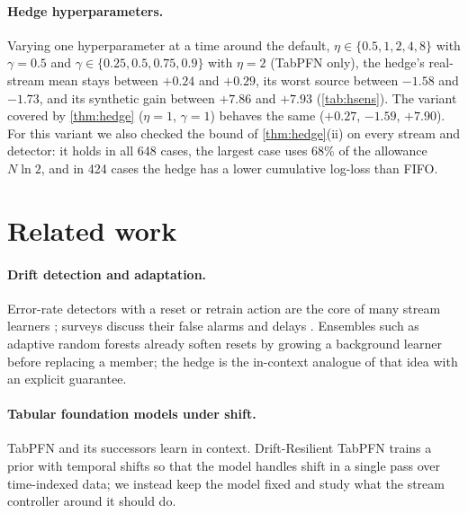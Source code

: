 \documentclass[10pt]{article}
\theoremstyle{definition}
\theoremstyle{remark}
\begin{document}
\paragraph{Hedge hyperparameters.}

Varying one hyperparameter at a time around the default, $\eta\in\{0.5,1,2,4,8\}$ with $\gamma=0.5$ and
$\gamma\in\{0.25,0.5,0.75,0.9\}$ with $\eta=2$ (TabPFN only), the hedge's real-stream mean stays between $+0.24$
and $+0.29$, its worst source between $-1.58$ and $-1.73$, and its synthetic gain between $+7.86$ and $+7.93$
(\cref{tab:hsens}). The variant covered by \cref{thm:hedge} ($\eta=1$, $\gamma=1$) behaves the same ($+0.27$,
$-1.59$, $+7.90$). For this variant we also checked the bound of \cref{thm:hedge}(ii) on every stream and detector:
it holds in all 648 cases, the largest case uses 68\% of the allowance $N\ln2$, and in 424 cases the hedge has a lower
cumulative log-loss than FIFO.

\section{Related work}
\label{sec:related}

\paragraph{Drift detection and adaptation.} Error-rate detectors with a reset or retrain action are the core of many
stream learners \citep{gama2004ddm,baena2006eddm,bifet2007adwin,frias2015hddm,pesaranghader2016fhddm,raab2020kswin};
surveys discuss their false alarms and delays \citep{gama2014survey,lu2019survey}. Ensembles such as adaptive random
forests \citep{gomes2017arf} already soften resets by growing a background learner before replacing a member; the hedge
is the in-context analogue of that idea with an explicit guarantee.

\paragraph{Tabular foundation models under shift.} TabPFN and its successors \citep{hollmann2023tabpfn,
hollmann2025tabpfn,qu2025tabicl,ma2024tabdpt} learn in context. Drift-Resilient TabPFN \citep{helli2024drift} trains a
prior with temporal shifts so that the model handles shift in a single pass over time-indexed data; we instead keep the
model fixed and study what the stream controller around it should do.
\end{document}
